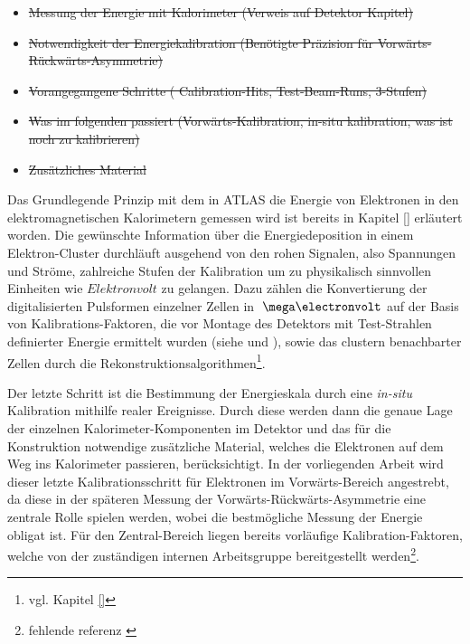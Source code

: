 \begin{itemize}
    \item \sout{Messung der Energie mit Kalorimeter (Verweis auf Detektor
        Kapitel)}
    \item \sout{Notwendigkeit der Energiekalibration (Benötigte Präzision für 
        Vorwärts-Rückwärts-Asymmetrie)}
    \item \sout{Vorangegangene Schritte ( Calibration-Hits, Test-Beam-Runs,
        3-Stufen)}
    \item \sout{Was im folgenden passiert (Vorwärts-Kalibration, in-situ
        kalibration, was ist noch zu kalibrieren)}
    \item \sout{Zusätzliches Material}
\end{itemize}

Das Grundlegende Prinzip mit dem in ATLAS die Energie von Elektronen in den
elektromagnetischen Kalorimetern gemessen wird ist bereits in Kapitel \ref{}
erläutert worden. Die gewünschte Information über die Energiedeposition in
einem Elektron-Cluster durchläuft ausgehend von den rohen Signalen, also
Spannungen und Ströme, zahlreiche Stufen der Kalibration um zu physikalisch
sinnvollen Einheiten wie $Elektronvolt$ zu gelangen. Dazu zählen die
Konvertierung der digitalisierten Pulsformen einzelner Zellen in $\MeV$ auf der
Basis von Kalibrations-Faktoren, die vor Montage des Detektors mit
Test-Strahlen definierter Energie ermittelt wurden (siehe \cite{Aleksa:942528}
und \cite{1748-0221-3-02-P02002}), sowie das clustern benachbarter Zellen durch
die Rekonstruktionsalgorithmen\footnote{vgl. Kapitel \ref{}}.

Der letzte Schritt ist die Bestimmung der Energieskala durch eine
\textit{in-situ} Kalibration mithilfe realer Ereignisse. Durch diese werden
dann die genaue Lage der einzelnen Kalorimeter-Komponenten im Detektor und das
für die Konstruktion notwendige zusätzliche Material, welches die Elektronen
auf dem Weg ins Kalorimeter passieren, berücksichtigt. In der vorliegenden
Arbeit wird dieser letzte Kalibrationsschritt für Elektronen im
Vorwärts-Bereich angestrebt, da diese in der späteren Messung der
Vorwärts-Rückwärts-Asymmetrie eine zentrale Rolle spielen werden, wobei die
bestmögliche Messung der Energie obligat ist. Für den Zentral-Bereich liegen
bereits vorläufige Kalibration-Faktoren, welche von der zuständigen internen
Arbeitsgruppe bereitgestellt werden\footnote{fehlende referenz \cite{}}.









